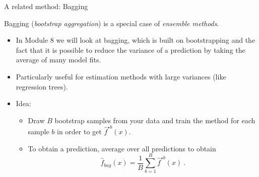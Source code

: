 \documentclass[10pt,ignorenonframetext,]{beamer}
\providecommand{\tightlist}{%
  \setlength{\itemsep}{0pt}\setlength{\parskip}{0pt}}
\begin{document}
\begin{frame}

\begin{block}{A related method: Bagging}

\vspace{2mm}

Bagging (\emph{bootstrap aggregation}) is a special case of
\emph{ensemble methods}.

\vspace{2mm}

\begin{itemize}
\item
  In Module 8 we will look at bagging, which is built on bootstrapping
  and the fact that it is possible to reduce the variance of a
  prediction by taking the average of many model fits.
\item
  Particularly useful for estimation methods with large variances (like
  regression trees).
\item
  Idea:

  \begin{itemize}
  \tightlist
  \item
    Draw \(B\) bootstrap samples from your data and train the method for
    each sample \(b\) in order to get \(\hat{f}^{\star b}(x)\).
  \item
    To obtain a prediction, average over all predictions to obtain
    \[\hat{f}_{bag}(x) = \frac{1}{B} \sum_{b=1}^B \hat{f}^{\star b}(x) \ .\]
  \end{itemize}
\end{itemize}

\end{block}

\end{frame}
\end{document}
